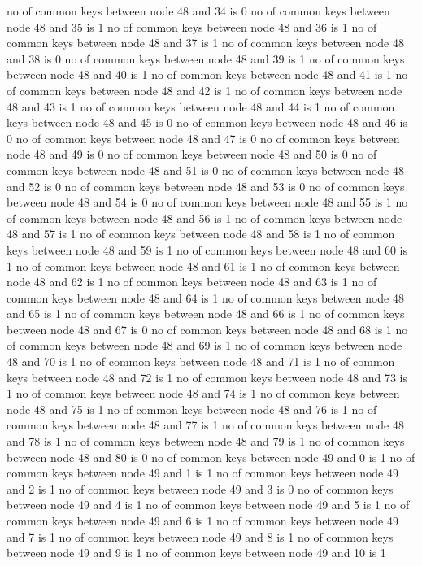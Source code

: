 no of common keys between node 48 and 34 is 0
no of common keys between node 48 and 35 is 1
no of common keys between node 48 and 36 is 1
no of common keys between node 48 and 37 is 1
no of common keys between node 48 and 38 is 0
no of common keys between node 48 and 39 is 1
no of common keys between node 48 and 40 is 1
no of common keys between node 48 and 41 is 1
no of common keys between node 48 and 42 is 1
no of common keys between node 48 and 43 is 1
no of common keys between node 48 and 44 is 1
no of common keys between node 48 and 45 is 0
no of common keys between node 48 and 46 is 0
no of common keys between node 48 and 47 is 0
no of common keys between node 48 and 49 is 0
no of common keys between node 48 and 50 is 0
no of common keys between node 48 and 51 is 0
no of common keys between node 48 and 52 is 0
no of common keys between node 48 and 53 is 0
no of common keys between node 48 and 54 is 0
no of common keys between node 48 and 55 is 1
no of common keys between node 48 and 56 is 1
no of common keys between node 48 and 57 is 1
no of common keys between node 48 and 58 is 1
no of common keys between node 48 and 59 is 1
no of common keys between node 48 and 60 is 1
no of common keys between node 48 and 61 is 1
no of common keys between node 48 and 62 is 1
no of common keys between node 48 and 63 is 1
no of common keys between node 48 and 64 is 1
no of common keys between node 48 and 65 is 1
no of common keys between node 48 and 66 is 1
no of common keys between node 48 and 67 is 0
no of common keys between node 48 and 68 is 1
no of common keys between node 48 and 69 is 1
no of common keys between node 48 and 70 is 1
no of common keys between node 48 and 71 is 1
no of common keys between node 48 and 72 is 1
no of common keys between node 48 and 73 is 1
no of common keys between node 48 and 74 is 1
no of common keys between node 48 and 75 is 1
no of common keys between node 48 and 76 is 1
no of common keys between node 48 and 77 is 1
no of common keys between node 48 and 78 is 1
no of common keys between node 48 and 79 is 1
no of common keys between node 48 and 80 is 0
no of common keys between node 49 and 0 is 1
no of common keys between node 49 and 1 is 1
no of common keys between node 49 and 2 is 1
no of common keys between node 49 and 3 is 0
no of common keys between node 49 and 4 is 1
no of common keys between node 49 and 5 is 1
no of common keys between node 49 and 6 is 1
no of common keys between node 49 and 7 is 1
no of common keys between node 49 and 8 is 1
no of common keys between node 49 and 9 is 1
no of common keys between node 49 and 10 is 1
